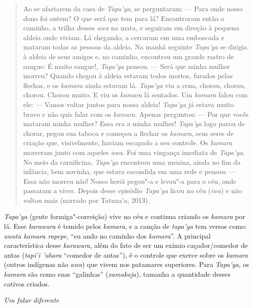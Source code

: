 \begin{quote}
Ao se afastarem da casa de \emph{Tapa'ya}, se perguntaram: --- Para onde
nosso dono foi ontem? O que será que tem para lá? Encontraram então o
caminho, a trilha desses \emph{awa} na mata, e seguiram em direção à
pequena aldeia onde viviam. Lá chegando, a cercaram em uma emboscada e
mataram todas as pessoas da aldeia. Na manhã seguinte \emph{Tapa'ya} se
dirigia à aldeia de seus amigos e, no caminho, encontrou um grande
rastro de sangue: É muito sangue!, \emph{Tapa'ya} pensou. --- Será que
minha mulher morreu? Quando chegou à aldeia estavam todos mortos,
furados pelas flechas, e os \emph{kamara} ainda estavam lá.
\emph{Tapa'ya} viu a cena, chorou, chorou, chorou. Chorou muito. E viu
os \emph{kamara} lá sentados. Um \emph{kamara} falou com ele: --- Vamos
voltar juntos para nossa aldeia! \emph{Tapa'ya} já estava muito bravo e
não quis falar com os \emph{kamara}. Apenas perguntou: --- Por que vocês
mataram minha mulher? Essa era a minha mulher! \emph{Tapa'ya} logo parou
de chorar, pegou sua taboca e começou a flechar os \emph{kamara}, seus
seres de criação que, visivelmente, haviam escapado a seu controle. Os
\emph{kamara} morreram junto com aqueles \emph{awa}. Foi uma vingança
imediata de \emph{Tapa'ya}. No meio da carnificina, \emph{Tapa'ya}
encontrou uma menina, ainda no fim da infância, bem novinha, que estava
escondida em uma rede e pensou: --- Essa não morreu não! Nosso herói
pegou"-a e levou"-a para o céu, onde passaram a viver. Depois desse
episódio \emph{Tapa'ya} ficou no céu (\emph{iwa}) e não voltou mais
(narrado por Tatuxa'a, 2013).
\end{quote}

\emph{Tapa'ya} (gente formiga"-correição) vive no céu e continua criando
os \emph{kamara} por lá. Esse \emph{karawara} é temido pelos
\emph{kamara}, e a canção de \emph{tapa'ya} tem versos como: \emph{awata
kamara rapepe}, ``eu ando no caminho dos \emph{kamara}''. A principal
característica desse \emph{karawara}, além do fato de ser um exímio
caçador/comedor de antas (\emph{tapi'i 'uhara} ``comedor de antas''), é
o controle que exerce sobre os \emph{kamara} (outros indígenas não
\emph{awa}) que vivem nos patamares superiores. Para \emph{Tapa'ya}, os
\emph{kamara} são como suas ``galinhas'' (\emph{xamakaja}), tamanha a
quantidade desses cativos criados.

\emph{Um falar diferente}

